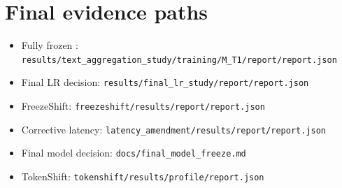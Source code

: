 \chapter{Final evidence paths}
\begin{itemize}
\item Fully frozen \MTone{}: \texttt{results/\linebreak[1]text\_\linebreak[1]aggregation\_\linebreak[1]study/\linebreak[1]training/\linebreak[1]M\_\linebreak[1]T1/\linebreak[1]report/\linebreak[1]report.\linebreak[1]json}
\item Final LR decision: \texttt{results/\linebreak[1]final\_\linebreak[1]lr\_\linebreak[1]study/\linebreak[1]report/\linebreak[1]report.\linebreak[1]json}
\item FreezeShift: \texttt{freezeshift/\linebreak[1]results/\linebreak[1]report/\linebreak[1]report.\linebreak[1]json}
\item Corrective latency: \texttt{latency\_\linebreak[1]amendment/\linebreak[1]results/\linebreak[1]report/\linebreak[1]report.\linebreak[1]json}
\item Final model decision: \texttt{docs/\linebreak[1]final\_\linebreak[1]model\_\linebreak[1]freeze.\linebreak[1]md}
\item TokenShift: \texttt{tokenshift/\linebreak[1]results/\linebreak[1]profile/\linebreak[1]report.\linebreak[1]json}

\end{itemize}
